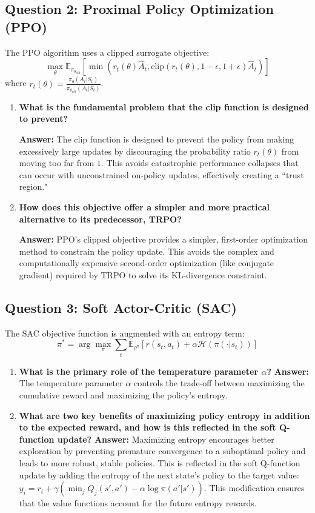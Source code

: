 \documentclass[12pt]{article}
\begin{document}
\subsection{Question 2: Proximal Policy Optimization (PPO)}
The PPO algorithm uses a clipped surrogate objective:
$$ \max_\theta \mathbb{E}_{\pi_{\theta_{old}}} \left[ \min\left( r_t(\theta) \hat{A}_t, \text{clip}(r_t(\theta), 1 - \epsilon, 1 + \epsilon) \hat{A}_t \right) \right] $$
where $r_t(\theta) = \frac{\pi_\theta(A_t|S_t)}{\pi_{\theta_{old}}(A_t|S_t)}$.
\begin{enumerate}
    \item \textbf{What is the fundamental problem that the clip function is designed to prevent?}
    
    \textbf{Answer:} The clip function is designed to prevent the policy from making excessively large updates by discouraging the probability ratio $r_t(\theta)$ from moving too far from $1$. This avoids catastrophic performance collapses that can occur with unconstrained on-policy updates, effectively creating a ``trust region."
    \item \textbf{How does this objective offer a simpler and more practical alternative to its predecessor, TRPO?}

    \textbf{Answer:} PPO's clipped objective provides a simpler, first-order optimization method to constrain the policy update. This avoids the complex and computationally expensive second-order optimization (like conjugate gradient) required by TRPO to solve its KL-divergence constraint.
\end{enumerate}

\subsection{Question 3: Soft Actor-Critic (SAC)}
The SAC objective function is augmented with an entropy term:
$$ \pi^* = \arg\max_\pi \sum_t \mathbb{E}_{\rho^\pi} [r(s_t, a_t) + \alpha \mathcal{H}(\pi(\cdot|s_t))] $$
\begin{enumerate}
    \item \textbf{What is the primary role of the temperature parameter $\alpha$?}
    \textbf{Answer:} The temperature parameter $\alpha$ controls the trade-off between maximizing the cumulative reward and maximizing the policy's entropy.
    \item \textbf{What are two key benefits of maximizing policy entropy in addition to the expected reward, and how is this reflected in the soft Q-function update?}
    \textbf{Answer:} Maximizing entropy encourages better exploration by preventing premature convergence to a suboptimal policy and leads to more robust, stable policies. This is reflected in the soft Q-function update by adding the entropy of the next state's policy to the target value: $y_i = r_i + \gamma(\min_j Q_j(s', a') - \alpha \log\pi(a'|s'))$. This modification ensures that the value functions account for the future entropy rewards.
\end{enumerate}
\end{document}
